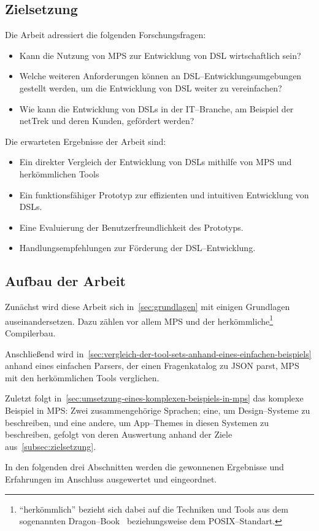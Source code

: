 \subsection{Zielsetzung}\label{subsec:zielsetzung}
Die Arbeit adressiert die folgenden Forschungsfragen:
\begin{itemize}
    \item Kann die Nutzung von \ac{MPS} zur Entwicklung von \ac{DSL} wirtschaftlich sein?
    \item Welche weiteren Anforderungen können an \ac{DSL}--Entwicklungsumgebungen gestellt werden, um die Entwicklung von \ac{DSL} weiter zu vereinfachen?
    \item Wie kann die Entwicklung von \acp{DSL} in der \acs{IT}--Branche, am Beispiel der \ac{netTrek} und deren Kunden, gefördert werden?
\end{itemize}
Die erwarteten Ergebnisse der Arbeit sind:
\begin{itemize}
    \item Ein direkter Vergleich der Entwicklung von \acp{DSL} mithilfe von \ac{MPS} und herkömmlichen Tools
    \item Ein funktionsfähiger Prototyp zur effizienten und intuitiven Entwicklung von \acp{DSL}.
    \item Eine Evaluierung der Benutzerfreundlichkeit des Prototyps.
    \item Handlungsempfehlungen zur Förderung der \acs{DSL}--Entwicklung.
\end{itemize}

\subsection{Aufbau der Arbeit}\label{subsec:aufbau-der-arbeit}
Zunächst wird diese Arbeit sich in~\autoref{sec:grundlagen} mit einigen Grundlagen auseinandersetzen.
Dazu zählen vor allem \ac{MPS} und der herkömmliche\footnote{\enquote{herkömmlich} bezieht sich dabei auf die Techniken und Tools aus dem sogenannten Dragon--Book~\autocite{aho-2006} beziehungsweise dem \acs{POSIX}--Standart.} Compilerbau.

Anschließend wird in~\autoref{sec:vergleich-der-tool-sets-anhand-eines-einfachen-beispiels} anhand eines einfachen Parsers, der einen Fragenkatalog zu \ac{JSON} parst, \ac{MPS} mit den herkömmlichen Tools verglichen.

Zuletzt folgt in~\autoref{sec:umsetzung-eines-komplexen-beispiels-in-mps} das komplexe Beispiel in \ac{MPS}: Zwei zusammengehörige Sprachen; eine, um Design--Systeme zu beschreiben, und eine andere, um App--Themes in diesen Systemen zu beschreiben, gefolgt von deren Auswertung anhand der Ziele aus~\autoref{subsec:zielsetzung}.

In den folgenden drei Abschnitten werden die gewonnenen Ergebnisse und Erfahrungen im Anschluss ausgewertet und eingeordnet.
